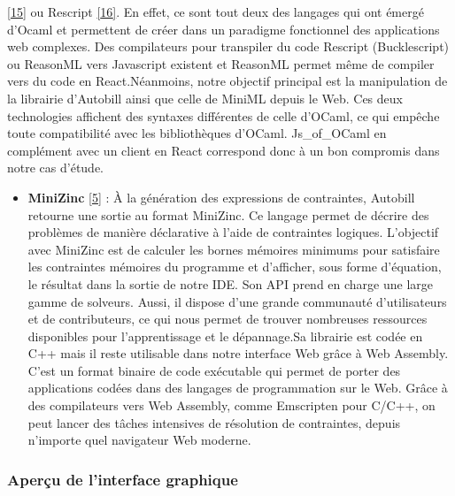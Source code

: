 \documentclass[
  12pt,
]{article}
\providecommand{\tightlist}{%
  \setlength{\itemsep}{0pt}\setlength{\parskip}{0pt}}
\begin{document}
\begin{itemize}
        \protect\hyperlink{ref-reasonml}{{[}15{]}} ou Rescript
        \protect\hyperlink{ref-rescript}{{[}16{]}}. En effet, ce sont tout
        deux des langages qui ont émergé d'Ocaml et permettent de créer dans
        un paradigme fonctionnel des applications web complexes. Des
        compilateurs pour transpiler du code Rescript (Bucklescript) ou
        ReasonML vers Javascript existent et ReasonML permet même de compiler
        vers du code en React.\newline  Néanmoins, notre objectif principal
        est la manipulation de la librairie d'Autobill ainsi que celle de
        MiniML depuis le Web. Ces deux technologies affichent des syntaxes
        différentes de celle d'OCaml, ce qui empêche toute compatibilité avec
        les bibliothèques d'OCaml. Js\_of\_OCaml en complément avec un client
        en React correspond donc à un bon compromis dans notre cas d'étude.
\end{itemize}

\newpage

\begin{itemize}
  \tightlist
  \item
        \textbf{MiniZinc} \protect\hyperlink{ref-minizinc}{{[}5{]}} : À la
        génération des expressions de contraintes, Autobill retourne une
        sortie au format MiniZinc. Ce langage permet de décrire des problèmes
        de manière déclarative à l'aide de contraintes logiques. L'objectif
        avec MiniZinc est de calculer les bornes mémoires minimums pour
        satisfaire les contraintes mémoires du programme et d'afficher, sous
        forme d'équation, le résultat dans la sortie de notre IDE. Son API
        prend en charge une large gamme de solveurs. Aussi, il dispose d'une
        grande communauté d'utilisateurs et de contributeurs, ce qui nous
        permet de trouver nombreuses ressources disponibles pour
        l'apprentissage et le dépannage.\newline  Sa librairie est codée en
        C++ mais il reste utilisable dans notre interface Web grâce à Web
        Assembly. C'est un format binaire de code exécutable qui permet de
        porter des applications codées dans des langages de programmation sur
        le Web. Grâce à des compilateurs vers Web Assembly, comme Emscripten
        pour C/C++, on peut lancer des tâches intensives de résolution de
        contraintes, depuis n'importe quel navigateur Web moderne.
\end{itemize}

\hypertarget{aperuxe7u-de-linterface-graphique}{%
  \subsubsection{Aperçu de l'interface
    graphique}\label{aperuxe7u-de-linterface-graphique}}
\end{document}
